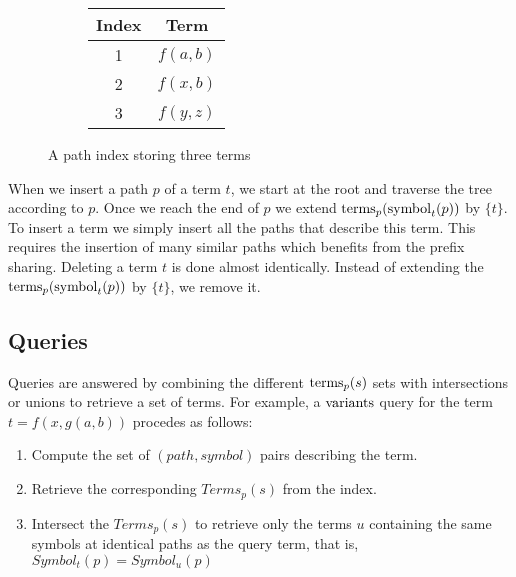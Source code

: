 \begin{figure}[h]
  \begin{subfigure}{0.66\textwidth}
  \end{subfigure}
  \begin{subfigure}{0.33\textwidth}
    \begin{tabular} { c|c }
      Index & Term\\
      \hline
      1 & $f(a,b)$\\
      2 & $f(x,b)$\\
      3 & $f(y,z)$
    \end{tabular}
  \end{subfigure}
  \caption{A path index storing three terms} \label{pathindex}
\end{figure}

When we insert a path $p$ of a term $t$, we start at the root and traverse the tree according to $p$. Once we reach the end of $p$ we extend $\mathrm{terms}_{p} (\mathrm{symbol}_{t} (p))$ by $\{t\}$. To insert a term we simply insert all the paths that describe this term. This requires the insertion of many similar paths which benefits from the prefix sharing. Deleting a term $t$ is done almost identically. Instead of extending the $\mathrm{terms}_{p} (\mathrm{symbol}_{t} (p))$ by $\{t\}$, we remove it.

\subsection{Queries}
Queries are answered by combining the different $\mathrm{terms}_{p}(s)$ sets with intersections or unions to retrieve a set of terms. For example, a $\mathrm{variants}$ query for the term $t = f(x,g(a,b))$
procedes as follows:

\begin{enumerate}
  \item Compute the set of $(path, symbol)$ pairs describing the term.
  \item Retrieve the corresponding $Terms_{p}(s)$ from the index.
  \item Intersect the $Terms_{p}(s)$ to retrieve only the terms $u$ containing the same symbols at identical paths as the query term, that is, $Symbol_{t}(p) = Symbol_{u}(p)$
\end{enumerate}

